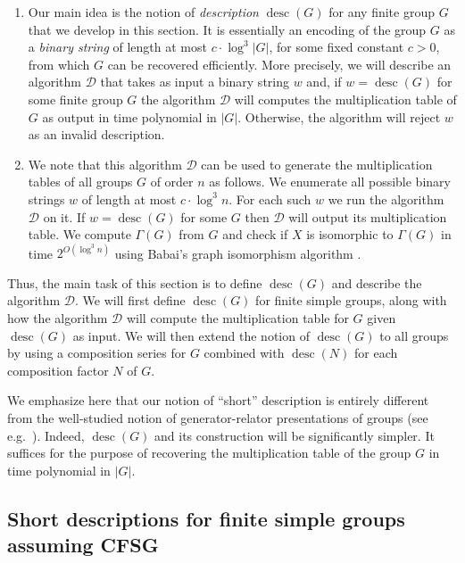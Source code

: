 \documentclass{elsarticle}
\newcommand{\desc}{\mathop{\mathrm{desc}}}
\begin{document}
\begin{enumerate}
\item Our main idea is the notion of \emph{description} $\desc(G)$ for
  any finite group $G$ that we develop in this section. It is
  essentially an encoding of the group $G$ as a \emph{binary string}
  of length at most $c\cdot \log^3 |G|$, for some fixed constant
  $c>0$, from which $G$ can be recovered efficiently. More precisely,
  we will describe an algorithm $\mathcal{D}$ that takes as input a
  binary string $w$ and, if $w=\desc(G)$ for some finite group $G$ the
  algorithm $\mathcal{D}$ will computes the multiplication table of
  $G$ as output in time polynomial in $|G|$. Otherwise, the algorithm
  will reject $w$ as an invalid description.

\item We note that this algorithm $\mathcal{D}$ can be used to
  generate the multiplication tables of all groups $G$ of order $n$ as
  follows. We enumerate all possible binary strings $w$ of length at
  most $c\cdot \log^3 n$. For each such $w$ we run the algorithm
  $\mathcal{D}$ on it. If $w=\desc(G)$ for some $G$ then $\mathcal{D}$
  will output its multiplication table. We compute $\Gamma(G)$ from
  $G$ and check if $X$ is isomorphic to $\Gamma(G)$ in time
  $2^{O(\log^3 n)}$ using Babai's graph isomorphism algorithm
  \cite{B16}.
\end{enumerate}

Thus, the main task of this section is to define $\desc(G)$ and
describe the algorithm $\mathcal{D}$. We will first define $\desc(G)$
for finite simple groups, along with how the algorithm $\mathcal{D}$
will compute the multiplication table for $G$ given $\desc(G)$ as
input. We will then extend the notion of $\desc(G)$ to all groups by
using a composition series for $G$ combined with $\desc(N)$ for each
composition factor $N$ of $G$.

\begin{remark}
  We emphasize here that our notion of ``short'' description is
  entirely different from the well-studied notion of
  generator-relator presentations of groups (see e.g.\
  \cite{Bab}). Indeed, $\desc(G)$ and its construction will be
  significantly simpler. It suffices for the purpose of recovering the
  multiplication table of the group $G$ in time polynomial in $|G|$.
\end{remark}

\subsection{Short descriptions for finite simple groups assuming CFSG}\label{cfsg-sec}
\end{document}

